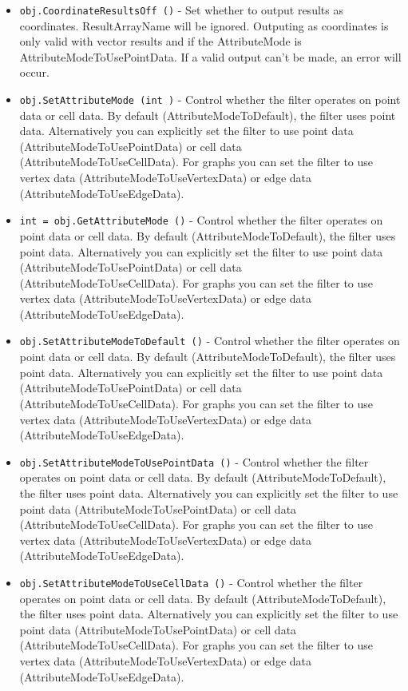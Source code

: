 \begin{itemize}
\item  \verb|obj.CoordinateResultsOff ()| -  Set whether to output results as coordinates.  ResultArrayName will be
 ignored.  Outputing as coordinates is only valid with vector results and
 if the AttributeMode is AttributeModeToUsePointData.
 If a valid output can't be made, an error will occur.

\item  \verb|obj.SetAttributeMode (int )| -  Control whether the filter operates on point data or cell data.
 By default (AttributeModeToDefault), the filter uses point
 data. Alternatively you can explicitly set the filter to use point data
 (AttributeModeToUsePointData) or cell data (AttributeModeToUseCellData).
 For graphs you can set the filter to use vertex data
 (AttributeModeToUseVertexData) or edge data (AttributeModeToUseEdgeData).

\item  \verb|int = obj.GetAttributeMode ()| -  Control whether the filter operates on point data or cell data.
 By default (AttributeModeToDefault), the filter uses point
 data. Alternatively you can explicitly set the filter to use point data
 (AttributeModeToUsePointData) or cell data (AttributeModeToUseCellData).
 For graphs you can set the filter to use vertex data
 (AttributeModeToUseVertexData) or edge data (AttributeModeToUseEdgeData).

\item  \verb|obj.SetAttributeModeToDefault ()| -  Control whether the filter operates on point data or cell data.
 By default (AttributeModeToDefault), the filter uses point
 data. Alternatively you can explicitly set the filter to use point data
 (AttributeModeToUsePointData) or cell data (AttributeModeToUseCellData).
 For graphs you can set the filter to use vertex data
 (AttributeModeToUseVertexData) or edge data (AttributeModeToUseEdgeData).

\item  \verb|obj.SetAttributeModeToUsePointData ()| -  Control whether the filter operates on point data or cell data.
 By default (AttributeModeToDefault), the filter uses point
 data. Alternatively you can explicitly set the filter to use point data
 (AttributeModeToUsePointData) or cell data (AttributeModeToUseCellData).
 For graphs you can set the filter to use vertex data
 (AttributeModeToUseVertexData) or edge data (AttributeModeToUseEdgeData).

\item  \verb|obj.SetAttributeModeToUseCellData ()| -  Control whether the filter operates on point data or cell data.
 By default (AttributeModeToDefault), the filter uses point
 data. Alternatively you can explicitly set the filter to use point data
 (AttributeModeToUsePointData) or cell data (AttributeModeToUseCellData).
 For graphs you can set the filter to use vertex data
 (AttributeModeToUseVertexData) or edge data (AttributeModeToUseEdgeData).


\end{itemize}
